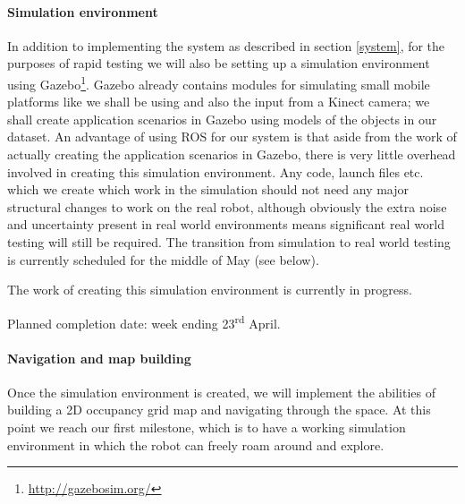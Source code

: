 \documentclass[a4paper,11pt,english]{article}
\begin{document}
\paragraph{Simulation environment}
In addition to implementing the system as described in section \ref{system}, for the purposes of rapid testing we will also be setting up a simulation environment using Gazebo\footnote{\url{http://gazebosim.org/}}.
Gazebo already contains modules for simulating small mobile platforms like we shall be using and also the input from a Kinect camera; we shall create application scenarios in Gazebo using models of the objects in our dataset.
An advantage of using ROS for our system is that aside from the work of actually creating the application scenarios in Gazebo, there is very little overhead involved in creating this simulation environment.
Any code, launch files etc. which we create which work in the simulation should not need any major structural changes to work on the real robot, although obviously the extra noise and uncertainty present in real world environments means significant real world testing will still be required.
The transition from simulation to real world testing is currently scheduled for the middle of May (see below).

The work of creating this simulation environment is currently in progress.

Planned completion date: week ending 23\textsuperscript{rd} April.


\paragraph{Navigation and map building}
Once the simulation environment is created, we will implement the abilities of building a 2D occupancy grid map and navigating through the space.
At this point we reach our first milestone, which is to have a working simulation environment in which the robot can freely roam around and explore.
\end{document}
